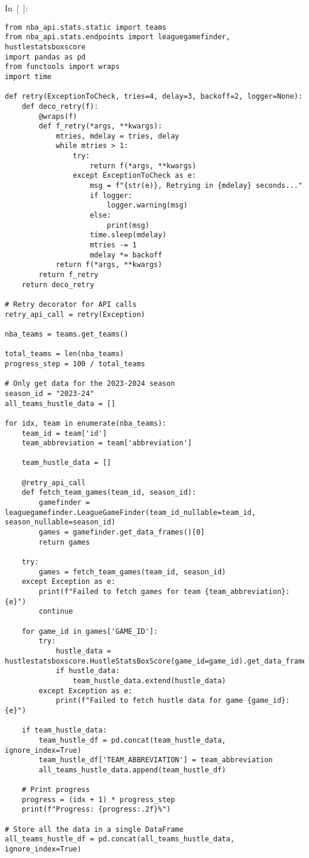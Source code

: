 In~{[}~{]}:

\begin{verbatim}
from nba_api.stats.static import teams
from nba_api.stats.endpoints import leaguegamefinder, hustlestatsboxscore
import pandas as pd
from functools import wraps
import time

def retry(ExceptionToCheck, tries=4, delay=3, backoff=2, logger=None):
    def deco_retry(f):
        @wraps(f)
        def f_retry(*args, **kwargs):
            mtries, mdelay = tries, delay
            while mtries > 1:
                try:
                    return f(*args, **kwargs)
                except ExceptionToCheck as e:
                    msg = f"{str(e)}, Retrying in {mdelay} seconds..."
                    if logger:
                        logger.warning(msg)
                    else:
                        print(msg)
                    time.sleep(mdelay)
                    mtries -= 1
                    mdelay *= backoff
            return f(*args, **kwargs)
        return f_retry
    return deco_retry

# Retry decorator for API calls
retry_api_call = retry(Exception)

nba_teams = teams.get_teams()

total_teams = len(nba_teams)
progress_step = 100 / total_teams

# Only get data for the 2023-2024 season
season_id = "2023-24"
all_teams_hustle_data = []

for idx, team in enumerate(nba_teams):
    team_id = team['id']
    team_abbreviation = team['abbreviation']

    team_hustle_data = []

    @retry_api_call
    def fetch_team_games(team_id, season_id):
        gamefinder = leaguegamefinder.LeagueGameFinder(team_id_nullable=team_id, season_nullable=season_id)
        games = gamefinder.get_data_frames()[0]
        return games

    try:
        games = fetch_team_games(team_id, season_id)
    except Exception as e:
        print(f"Failed to fetch games for team {team_abbreviation}: {e}")
        continue

    for game_id in games['GAME_ID']:
        try:
            hustle_data = hustlestatsboxscore.HustleStatsBoxScore(game_id=game_id).get_data_frames()
            if hustle_data:
                team_hustle_data.extend(hustle_data)
        except Exception as e:
            print(f"Failed to fetch hustle data for game {game_id}: {e}")

    if team_hustle_data:
        team_hustle_df = pd.concat(team_hustle_data, ignore_index=True)
        team_hustle_df['TEAM_ABBREVIATION'] = team_abbreviation
        all_teams_hustle_data.append(team_hustle_df)

    # Print progress
    progress = (idx + 1) * progress_step
    print(f"Progress: {progress:.2f}%")

# Store all the data in a single DataFrame
all_teams_hustle_df = pd.concat(all_teams_hustle_data, ignore_index=True)
\end{verbatim}

